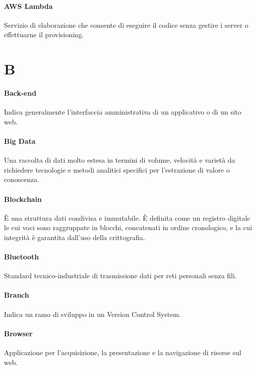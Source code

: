 \documentclass[]{article}
\begin{document}
	\paragraph*{AWS Lambda}
	Servizio di elaborazione che consente di eseguire il codice senza gestire i server o effettuarne il provisioning.
	
	\newpage
	
	\section*{B}
	
	\paragraph*{Back-end}
	Indica generalmente l'interfaccia amministrativa di un applicativo o di un sito web.
	
	\paragraph*{Big Data}
	Una raccolta di dati molto estesa in termini di	volume, velocità e varietà da richiedere tecnologie e metodi analitici specifici per l'estrazione di valore o conoscenza.
	
	\paragraph*{Blockchain}
	È una struttura dati condivisa e immutabile. È definita come un registro digitale le cui voci sono raggruppate in blocchi, concatenati in ordine cronologico, e la cui integrità è garantita dall'uso della crittografia.
	
	\paragraph*{Bluetooth}
	Standard tecnico-industriale di trasmissione dati per reti personali senza fili.
	
	\paragraph*{Branch}
	Indica un ramo di sviluppo in un Version Control System.
	
	\paragraph*{Browser}
	Applicazione per l'acquisizione, la presentazione e la navigazione di risorse sul web.
	
\end{document}
